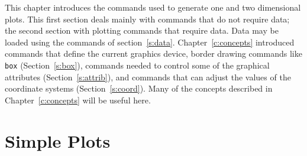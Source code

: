 %
%

This chapter introduces the commands used to generate one and two
dimensional plots.
This first section deals mainly with commands that do not require data;
the second section with plotting commands that require data.
Data may be loaded using the commands of section~\ref{s:data}.
Chapter~\ref{c:concepts} introduced commands that define the
current graphics device,
border drawing commands like
{\tt box}
(Section~\ref{s:box}),
commands needed to control
some of the graphical attributes (Section~\ref{s:attrib}),
and commands that can adjust the values of the coordinate systems
(Section~\ref{s:coord}).
Many of the concepts described in Chapter~\ref{c:concepts}
will be useful here.

\section               {Simple Plots}

